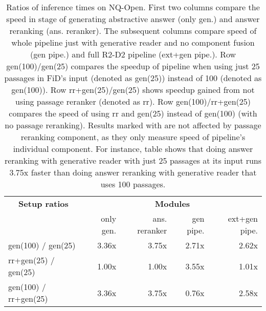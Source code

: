 \documentclass[11pt]{article}
\begin{document}
\begin{table*}
    \centering
    \begin{tabular}{l|rrrr}
\toprule
\multicolumn{1}{c|}{\textbf{Setup ratios}}               & \multicolumn{4}{c}{\textbf{Modules}}          \\
                      & only gen. & ans. reranker & gen pipe. & ext+gen pipe. \\\midrule
gen(100) / gen(25)    &     3.36x &         3.75x &     2.71x &         2.62x \\
rr+gen(25) / gen(25)  &     1.00x &         1.00x &     3.55x &         1.01x \\
gen(100) / rr+gen(25) &     3.36x &         3.75x &     0.76x &         2.58x \\\bottomrule
\end{tabular}     \caption{Ratios of inference times on NQ-Open. First two columns compare the speed in stage of generating abstractive answer (only gen.) and answer reranking (ans. reranker). The subsequent columns compare speed of whole pipeline just with generative reader and no component fusion (gen pipe.) and full R2-D2 pipeline (ext+gen pipe.). Row gen(100)/gen(25) compares the speedup of pipeline when using just 25 passages in FiD's input (denoted as gen(25)) instead of 100 (denoted as gen(100)). Row rr+gen(25)/gen(25) shows speedup gained from not using passage reranker (denoted as rr). Row gen(100)/rr+gen(25) compares the speed of using rr and gen(25) instead of  gen(100) (with no passage reranking). Results marked with  are not affected by passage reranking component, as they only measure speed of pipeline's individual component. For instance, table shows that doing answer reranking with generative reader with just 25 passages at its input runs 3.75x faster than doing answer reranking with generative reader that uses 100 passages.}
    \label{tab:inference_ratios}
\end{table*}
\end{document}
